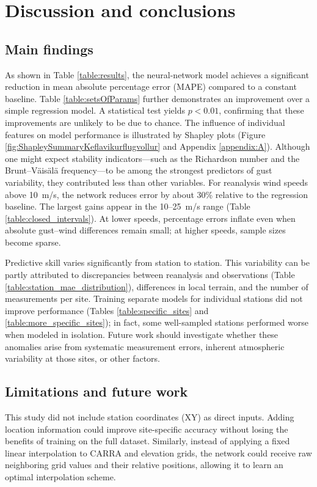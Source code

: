 \chapter{Discussion and conclusions}
\label{Chapter5}

\section{Main findings}
As shown in Table \ref{table:results}, the neural-network model achieves a significant reduction in mean absolute percentage error (MAPE) compared to a constant baseline. Table \ref{table:setsOfParams} further demonstrates an improvement over a simple regression model. A statistical test yields $p<0.01$, confirming that these improvements are unlikely to be due to chance. The influence of individual features on model performance is illustrated by Shapley plots (Figure \ref{fig:ShapleySummaryKeflavikurflugvollur} and Appendix \ref{appendix:A}). Although one might expect stability indicators—such as the Richardson number and the Brunt--Väisälä frequency—to be among the strongest predictors of gust variability, they contributed less than other variables. For reanalysis wind speeds above 10~m/s, the network reduces error by about 30\% relative to the regression baseline. The largest gains appear in the 10--25~m/s range (Table \ref{table:closed_intervals}). At lower speeds, percentage errors inflate even when absolute gust--wind differences remain small; at higher speeds, sample sizes become sparse.

Predictive skill varies significantly from station to station. This variability can be partly attributed to discrepancies between reanalysis and observations (Table \ref{table:station_mae_distribution}), differences in local terrain, and the number of measurements per site. Training separate models for individual stations did not improve performance (Tables \ref{table:specific_sites} and \ref{table:more_specific_sites}); in fact, some well-sampled stations performed worse when modeled in isolation. Future work should investigate whether these anomalies arise from systematic measurement errors, inherent atmospheric variability at those sites, or other factors.

\section{Limitations and future work}
This study did not include station coordinates (XY) as direct inputs. Adding location information could improve site-specific accuracy without losing the benefits of training on the full dataset. Similarly, instead of applying a fixed linear interpolation to CARRA and elevation grids, the network could receive raw neighboring grid values and their relative positions, allowing it to learn an optimal interpolation scheme.

